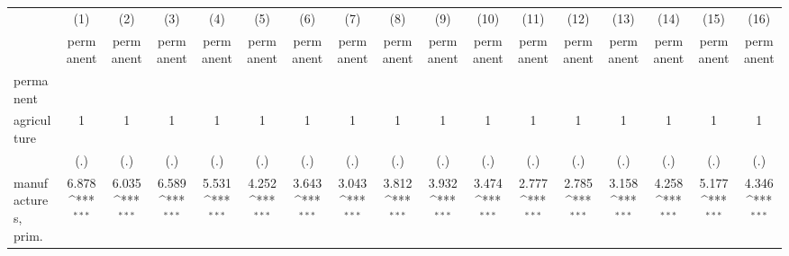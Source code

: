 {
\def\sym#1{\ifmmode^{#1}\else\(^{#1}\)\fi}
\begin{tabular}{l*{16}{c}}
\hline\hline
                    &\multicolumn{1}{c}{(1)}&\multicolumn{1}{c}{(2)}&\multicolumn{1}{c}{(3)}&\multicolumn{1}{c}{(4)}&\multicolumn{1}{c}{(5)}&\multicolumn{1}{c}{(6)}&\multicolumn{1}{c}{(7)}&\multicolumn{1}{c}{(8)}&\multicolumn{1}{c}{(9)}&\multicolumn{1}{c}{(10)}&\multicolumn{1}{c}{(11)}&\multicolumn{1}{c}{(12)}&\multicolumn{1}{c}{(13)}&\multicolumn{1}{c}{(14)}&\multicolumn{1}{c}{(15)}&\multicolumn{1}{c}{(16)}\\
                    &\multicolumn{1}{c}{permanent}&\multicolumn{1}{c}{permanent}&\multicolumn{1}{c}{permanent}&\multicolumn{1}{c}{permanent}&\multicolumn{1}{c}{permanent}&\multicolumn{1}{c}{permanent}&\multicolumn{1}{c}{permanent}&\multicolumn{1}{c}{permanent}&\multicolumn{1}{c}{permanent}&\multicolumn{1}{c}{permanent}&\multicolumn{1}{c}{permanent}&\multicolumn{1}{c}{permanent}&\multicolumn{1}{c}{permanent}&\multicolumn{1}{c}{permanent}&\multicolumn{1}{c}{permanent}&\multicolumn{1}{c}{permanent}\\
\hline
permanent           &                     &                     &                     &                     &                     &                     &                     &                     &                     &                     &                     &                     &                     &                     &                     &                     \\
agriculture         &           1         &           1         &           1         &           1         &           1         &           1         &           1         &           1         &           1         &           1         &           1         &           1         &           1         &           1         &           1         &           1         \\
                    &         (.)         &         (.)         &         (.)         &         (.)         &         (.)         &         (.)         &         (.)         &         (.)         &         (.)         &         (.)         &         (.)         &         (.)         &         (.)         &         (.)         &         (.)         &         (.)         \\
[1em]
manufactures, prim. &       6.878\sym{***}&       6.035\sym{***}&       6.589\sym{***}&       5.531\sym{***}&       4.252\sym{***}&       3.643\sym{***}&       3.043\sym{***}&       3.812\sym{***}&       3.932\sym{***}&       3.474\sym{***}&       2.777\sym{***}&       2.785\sym{***}&       3.158\sym{***}&       4.258\sym{***}&       5.177\sym{***}&       4.346\sym{***}\\

\end{tabular}}
